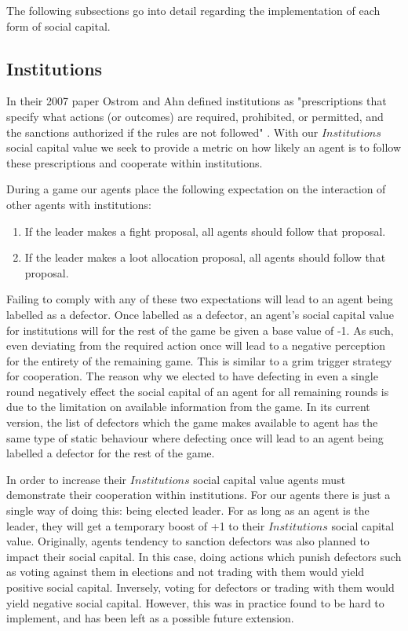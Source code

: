 The following subsections go into detail regarding the implementation of each form of social capital.

\subsection{Institutions}

In their 2007 paper Ostrom and Ahn defined institutions as "prescriptions that specify what actions (or outcomes) are required, prohibited, or permitted, and the sanctions authorized if the rules are not followed" \cite{ostrom-ahn}. With our $Institutions$ social capital value we seek to provide a metric on how likely an agent is to follow these prescriptions and cooperate within institutions. 

During a game our agents place the following expectation on the interaction of other agents with institutions:

\begin{enumerate}
    \item If the leader makes a fight proposal, all agents should follow that proposal.
    \item If the leader makes a loot allocation proposal, all agents should follow that proposal.
\end{enumerate}

Failing to comply with any of these two expectations will lead to an agent being labelled as a defector. Once labelled as a defector, an agent's social capital value for institutions will for the rest of the game be given a base value of -1. As such, even deviating from the required action once will lead to a negative perception for the entirety of the remaining game. This is similar to a grim trigger strategy for cooperation. The reason why we elected to have defecting in even a single round negatively effect the social capital of an agent for all remaining rounds is due to the limitation on available information from the game. In its current version, the list of defectors which the game makes available to agent has the same type of static behaviour where defecting once will lead to an agent being labelled a defector for the rest of the game.

In order to increase their $Institutions$ social capital value agents must demonstrate their cooperation within institutions. For our agents there is just a single way of doing this: being elected leader. For as long as an agent is the leader, they will get a temporary boost of +1 to their $Institutions$ social capital value. Originally, agents tendency to sanction defectors was also planned to impact their social capital. In this case, doing actions which punish defectors such as voting against them in elections and not trading with them would yield positive social capital. Inversely, voting for defectors or trading with them would yield negative social capital. However, this was in practice found to be hard to implement, and has been left as a possible future extension.

